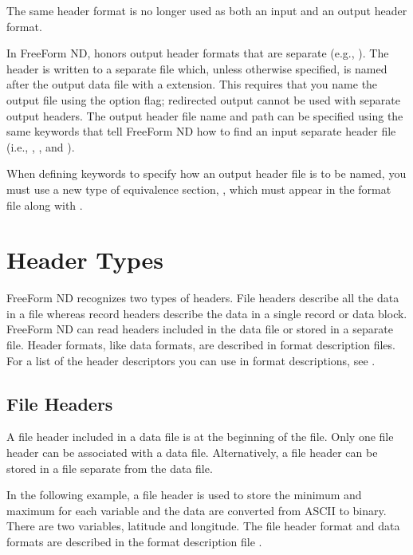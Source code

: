 The same header format is no longer used as both an input and an
output header format.

In FreeForm ND,  honors output header formats that are
separate (e.g., ). The header is
written to a separate file which, unless otherwise specified, is named
after the output data file with a  extension. This requires
that you name the output file using the  option flag; redirected
output cannot be used with separate output headers. The output header
file name and path can be specified using the same keywords that tell
FreeForm ND how to find an input separate header file (i.e.,
, , and
).

When defining keywords to specify how an output header file is to be
named, you must use a new type of equivalence section,
, which must appear in the format file along with
.

\section{Header Types}

FreeForm ND recognizes two types of headers. File headers describe all
the data in a file whereas record headers describe the data in a
single record or data block. FreeForm ND can read headers included in
the data file or stored in a separate file. Header formats, like data
formats, are described in format description files. For a list of the
header descriptors you can use in format descriptions, see
. 

\subsection{File Headers}

A file header included in a data file is at the beginning of the file.
Only one file header can be associated with a data file.
Alternatively, a file header can be stored in a file separate from the
data file.

In the following example, a file header is used to store the minimum
and maximum for each variable and the data are converted from ASCII to
binary. There are two variables, latitude and longitude. The file
header format and data formats are described in the format description
file .

